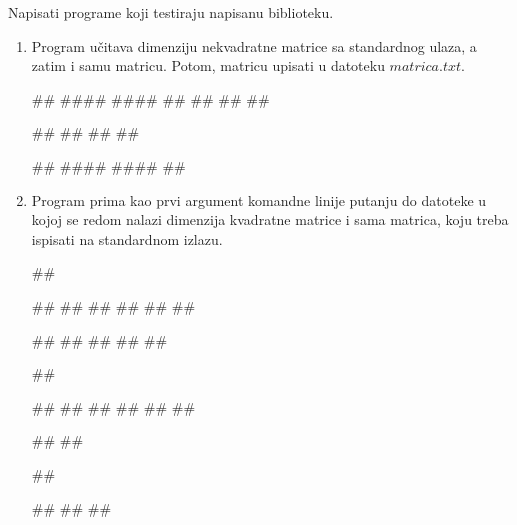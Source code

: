 \begin{Exercise}[label=2_19]
Napisati programe koji testiraju napisanu biblioteku.

\begin{enumerate}
\item[(1)] Program učitava dimenziju nekvadratne matrice sa
  standardnog ulaza, a zatim i samu matricu. Potom, matricu upisati u
  datoteku $matrica.txt$.

\begin{miditest}
\begin{upotreba}{1}
#\naslovInt#
####
####
##
##
##
##

##
##
##
##
\end{upotreba}
\end{miditest}
\begin{miditest}
\begin{upotreba}{2}
#\naslovInt#
####
####
##
\end{upotreba}
\end{miditest}

\item[(2)] Program prima kao prvi argument komandne linije putanju do
  datoteke u kojoj se redom nalazi dimenzija kvadratne matrice i sama
  matrica, koju treba ispisati na standardnom izlazu.
  
\begin{minitest}
\begin{test}{1}
##

##  
##
##
##
##
##

#\naslovIzlaz#
##
##
##
##
\end{test}
\end{minitest}
\begin{minitest}
\begin{test}{2}
##

##  
##
##
##
##
##

#\naslovIzlaz#
##
\end{test}
\end{minitest}
\begin{minitest}
\begin{test}{3}
##

#\naslovIzlaz#
##
##
\end{test}
\end{minitest}

\end{enumerate}
\end{Exercise}
